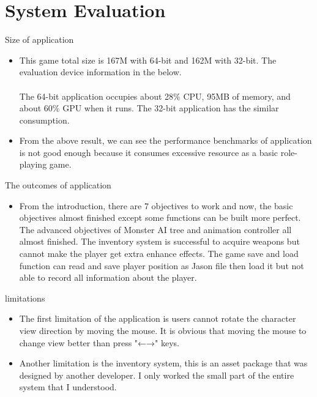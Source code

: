 \chapter{System Evaluation}
Size of application
\begin{itemize}
\item This game total size is 167M with 64-bit and 162M with 32-bit. The evaluation device information in the below.\\

\\
The 64-bit application occupies about 28\% CPU, 95MB of memory, and about 60\% GPU when it runs. The 32-bit application has the similar consumption. 
\item From the above result, we can see the performance benchmarks of application is not good enough because it consumes excessive resource as a basic role-playing game.
\end{itemize}
The outcomes of application
\begin{itemize}
\item From the introduction, there are 7 objectives to work and now, the basic objectives almost finished except some functions can be built more perfect. The advanced objectives of Monster AI tree and animation controller all almost finished. The inventory system is successful to acquire weapons but cannot make the player get extra enhance effects. The game save and load function can read and save player position as Jason file then load it but not able to record all information about the player.
\end{itemize}
limitations
\begin{itemize}
\item The first limitation of the application is users cannot rotate the character view direction by moving the mouse. It is obvious that moving the mouse to change view better than press "←→" keys.
\item Another limitation is the inventory system, this is an asset package that was designed by another developer. I only worked the small part of the entire system that I understood. 
\end{itemize}

